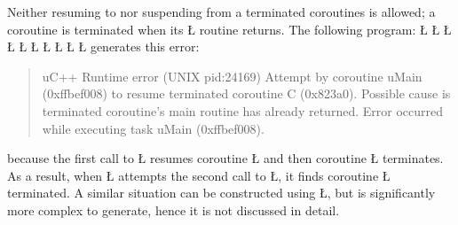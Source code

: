 \documentclass[openright,twoside]{report}
\begin{document}
Neither resuming to nor suspending from a terminated coroutines is allowed;
a coroutine is terminated when its \LGinlinetrue\LGbegin\lgrinde\L{}\endlgrinde\LGend{} routine returns.
The following program:
\LGinlinefalse\LGbegin\lgrinde
\L{}
\L{\LB{}}
\L{}
\L{\LB{}}
\L{\LB{\};}}
\L{}
\L{\LB{}}
\L{\LB{}}
\CE{}\L{\LB{}}
\CE{}\L{\LB{\}}}
\endlgrinde\LGend
generates this error:
\begin{quote}
\BGfont
uC++ Runtime error (UNIX pid:24169) Attempt by coroutine uMain (0xffbef008) to resume terminated coroutine C (0x823a0).
Possible cause is terminated coroutine's main routine has already returned.
Error occurred while executing task uMain (0xffbef008).
\end{quote}
because the first call to \LGinlinetrue\LGbegin\lgrinde\L{}\endlgrinde\LGend{} resumes coroutine \LGinlinetrue\LGbegin\lgrinde\L{}\endlgrinde\LGend{} and then coroutine \LGinlinetrue\LGbegin\lgrinde\L{}\endlgrinde\LGend{} terminates.
As a result, when \LGinlinetrue\LGbegin\lgrinde\L{}\endlgrinde\LGend{} attempts the second call to \LGinlinetrue\LGbegin\lgrinde\L{}\endlgrinde\LGend{}, it finds coroutine \LGinlinetrue\LGbegin\lgrinde\L{}\endlgrinde\LGend{} terminated.
A similar situation can be constructed using \LGinlinetrue\LGbegin\lgrinde\L{}\endlgrinde\LGend{}, but is significantly more complex to generate, hence it is not discussed in detail.
\end{document}
